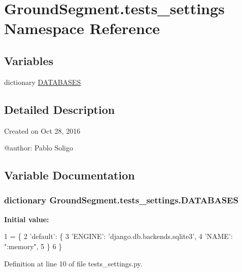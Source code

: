 \hypertarget{namespace_ground_segment_1_1tests__settings}{}\section{Ground\+Segment.\+tests\+\_\+settings Namespace Reference}
\label{namespace_ground_segment_1_1tests__settings}
\subsection*{Variables}
\begin{DoxyCompactItemize}
\item 
dictionary \hyperlink{namespace_ground_segment_1_1tests__settings_a58bcffe794e2e2edfd140abaa8dd90d2}{D\+A\+T\+A\+B\+A\+S\+E\+S}
\end{DoxyCompactItemize}


\subsection{Detailed Description}
\begin{DoxyVerb}Created on Oct 28, 2016

@author: Pablo Soligo
\end{DoxyVerb}
 

\subsection{Variable Documentation}
\hypertarget{namespace_ground_segment_1_1tests__settings_a58bcffe794e2e2edfd140abaa8dd90d2}{}
\subsubsection[{D\+A\+T\+A\+B\+A\+S\+E\+S}]{\setlength{\rightskip}{0pt plus 5cm}dictionary Ground\+Segment.\+tests\+\_\+settings.\+D\+A\+T\+A\+B\+A\+S\+E\+S}\label{namespace_ground_segment_1_1tests__settings_a58bcffe794e2e2edfd140abaa8dd90d2}
{\bfseries Initial value\+:}
\begin{DoxyCode}
1 = \{
2     \textcolor{stringliteral}{'default'}: \{
3         \textcolor{stringliteral}{'ENGINE'}: \textcolor{stringliteral}{'django.db.backends.sqlite3'},
4         \textcolor{stringliteral}{'NAME'}: \textcolor{stringliteral}{":memory"},
5     \}
6 \}
\end{DoxyCode}


Definition at line 10 of file tests\+\_\+settings.\+py.

